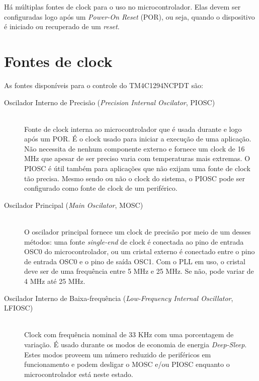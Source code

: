Há múltiplas fontes de clock para o uso no microcontrolador. Elas devem ser configuradas logo após um \emph{Power-On Reset} (POR), ou seja, quando o dispositivo é iniciado ou recuperado de um \emph{reset}.

\section{Fontes de clock}
As fontes disponíveis para o controle do TM4C1294NCPDT são:

\begin{description}
	\item [Oscilador Interno de Precisão (\emph{Precision Internal Oscilator}, PIOSC)]\hfill \\
	Fonte de clock interna ao microcontrolador que é usada durante e logo após um POR. É o clock usado para iniciar a execução de uma aplicação. Não necessita de nenhum componente externo e fornece um clock de 16 MHz que apesar de ser preciso varia com temperaturas mais extremas. O PIOSC é útil também para aplicações que não exijam uma fonte de clock tão precisa. Mesmo sendo ou não o clock do sistema, o PIOSC pode ser configurado como fonte de clock de um periférico.
	
	\item [Oscilador Principal (\emph{Main Oscilator}, MOSC)]\hfill \\
	O oscilador principal fornece um clock de precisão por meio de um desses métodos: uma fonte \emph{single-end} de clock é conectada ao pino de entrada OSC0 do microcontrolador, ou um cristal externo é conectado entre o pino de entrada OSC0 e o pino de saída OSC1. Com o PLL em uso, o cristal deve ser de uma frequência entre 5 MHz e 25 MHz. Se não, pode variar de 4 MHz até 25 MHz.
	
	\item [Oscilador Interno de Baixa-frequência (\emph{Low-Frequency Internal Oscillator}, LFIOSC)]\hfill \\
	Clock com frequência nominal de 33 KHz com uma porcentagem de variação. É usado durante os modos de economia de energia \emph{Deep-Sleep}. Estes modos proveem um número reduzido de periféricos em funcionamento e podem desligar o MOSC e/ou PIOSC enquanto o microcontrolador está neste estado.
	

\end{description}
